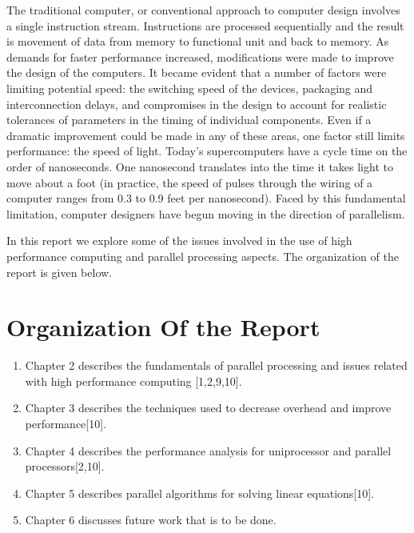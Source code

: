 The traditional computer, or conventional approach to computer design involves a single instruction stream. Instructions are processed sequentially and the
result is movement of data from memory to functional unit and back to memory. As demands for faster performance increased, modifications were made to
improve the design of the computers. It became evident that a number of factors were limiting potential speed: the switching speed of the devices, packaging
and interconnection delays, and compromises in the design to account for realistic tolerances of parameters in the timing of individual components. Even if a
dramatic improvement could be made in any of these areas, one factor still limits performance: the speed of light. Today's supercomputers have a cycle time
on the order of nanoseconds. One nanosecond translates into the time it takes light to move about a foot (in practice, the speed of pulses through the wiring
of a computer ranges from 0.3 to 0.9 feet per nanosecond). Faced by this fundamental limitation, computer designers have begun moving in the direction of
parallelism. \par
\hspace{1in} In this report we explore some of the issues involved in the use of high performance computing and parallel processing aspects. The organization
of the report is given below.

\section{Organization Of the Report}

\begin{enumerate}
\item Chapter 2 describes the fundamentals of parallel processing and issues related with high performance computing [1,2,9,10].
\item Chapter 3 describes the techniques used to decrease overhead and improve performance[10].
\item Chapter 4 describes the performance analysis for uniprocessor and parallel processors[2,10].
\item Chapter 5 describes parallel algorithms for solving linear equations[10].
\item Chapter 6 discusses future work that is to be done.
\end{enumerate}


